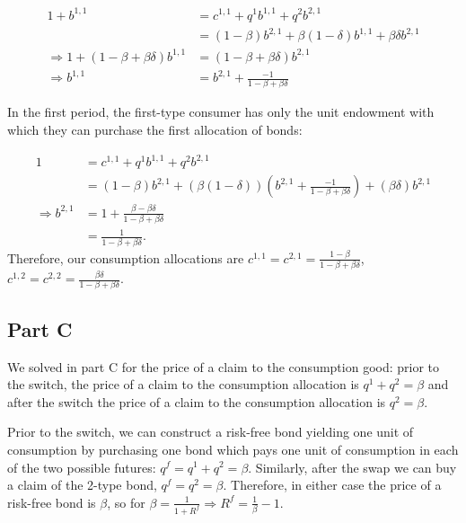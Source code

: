 \documentclass[11pt]{article} %
\begin{document}
\begin{align*}
1+b^{1,1}&= c^{1,1} + q^1b^{1,1} + q^2b^{2,1}\\
&=  (1-\beta)b^{2,1} + \beta(1-\delta)b^{1,1} +  \beta \delta b^{2,1} \\
\Rightarrow 1+(1-\beta + \beta \delta)b^{1,1} &= (1-\beta+\beta\delta)b^{2,1}\\
\Rightarrow b^{1,1}  &=  b^{2,1}+\frac{-1}{1-\beta + \beta \delta}
\end{align*}


In the first period, the first-type consumer has only the unit endowment with which they can purchase the first allocation of bonds:

\begin{align*}
1 &= c^{1,1} + q^1b^{1,1} + q^2b^{2,1}\\
 &= (1-\beta)b^{2,1} + ( \beta(1-\delta))\left( b^{2,1}+\frac{-1}{1-\beta + \beta \delta}\right) + (\beta\delta)b^{2,1}\\
\Rightarrow  b^{2,1} &= 1 + \frac{\beta - \beta\delta}{1-\beta + \beta\delta}\\
&= \frac{1}{1-\beta + \beta\delta}. 
\end{align*}
Therefore, our consumption allocations are $c^{1,1} = c^{2,1} = \frac{1-\beta}{1-\beta + \beta\delta}$, $c^{1,2} = c^{2,2} = \frac{\beta\delta}{1-\beta + \beta\delta}.$
\subsection{Part C}

We solved in part C for the price of a claim to the consumption good: prior to the switch, the price of a claim to the consumption allocation is  $q^1+q^2 = \beta $ and after the switch the price of a claim to the consumption allocation is $q^2 = \beta$.

Prior to the switch, we can construct a risk-free bond yielding one unit of consumption by purchasing one bond which pays one unit of consumption in each of the two possible futures: $q^f = q^1 + q^2 = \beta$. Similarly, after the swap we can buy a claim of the 2-type bond, $q^f = q^2 = \beta$. Therefore, in either case the price of a risk-free bond is $\beta$, so for $\beta = \frac{1}{1+R^f} \Rightarrow R^f = \frac{1}{\beta} -1$.
\end{document}
